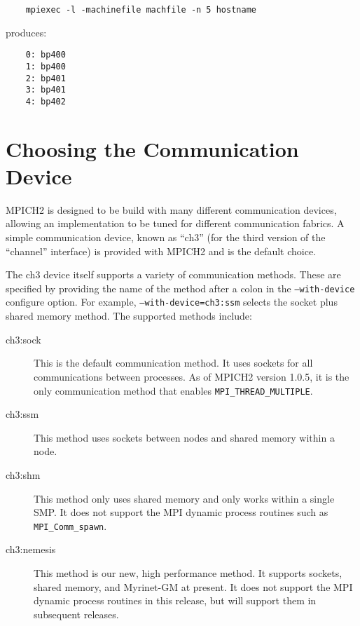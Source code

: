 \documentclass[dvipdfm,11pt]{article}
\begin{document}
\begin{verbatim}
    mpiexec -l -machinefile machfile -n 5 hostname
\end{verbatim}

produces:
\begin{verbatim}
    0: bp400
    1: bp400
    2: bp401
    3: bp401
    4: bp402
\end{verbatim}

\section{Choosing the Communication Device}
\label{sec:choose-device}

MPICH2 is designed to be build with many different communication devices,
allowing an implementation to be tuned for different communication fabrics.  A
simple communication device, known as ``ch3'' (for the third version of the
``channel'' interface) is provided with MPICH2 and is the default choice.

The ch3 device itself supports a variety of communication methods.  These are
specified by providing the name of the method after a colon in the
\texttt{--with-device} configure option.  For example,
\texttt{--with-device=ch3:ssm} selects the socket plus shared memory method.
The supported methods include:

\begin{description}
\item[ch3:sock]This is the default communication method.  It uses sockets for
  all communications between processes.  As of MPICH2 version 1.0.5, it is the
  only communication method that enables \texttt{MPI\_THREAD\_MULTIPLE}.
\item[ch3:ssm]This method uses sockets between nodes and shared memory within
a node.
\item[ch3:shm]This method only uses shared memory and only works within a
single SMP.  It does not support the MPI dynamic process routines such as
\texttt{MPI\_Comm\_spawn}. 
\item[ch3:nemesis]This method is our new, high performance method.  It
supports sockets, shared memory, and Myrinet-GM at present.  It does not
support the MPI dynamic process routines in this release, but will support
them in subsequent releases.
\end{description}
\end{document}
